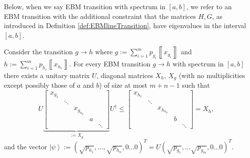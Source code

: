 \documentclass{article}
\begin{document}
Below, when we say EBM transition with spectrum in $[a,b]$, we refer
to an EBM transition with the additional constraint that the matrices
$H,G$,  as introduced in Definition \ref{def:EBMlineTransition}, have eigenvalues in the interval $[a,b]$. 
\begin{lemma}
 
Consider the transition $g\to h$ where $g:=\sum_{i=1}^{m}p_{g_{i}}\left\llbracket x_{g_{i}}\right\rrbracket $
and $h:=\sum_{i=1}^{m}p_{h_{i}}\left\llbracket x_{h_{i}}\right\rrbracket $.
For every EBM transition $g\to h$ with spectrum in $[a,b]$ there
exists a unitary matrix $U$, diagonal matrices $X_{h}$, $X_{g}$
(with no multiplicities except possibly those of $a$ and $b$) of
size at most $m+n-1$ such that 
\begin{equation}
U\underbrace{\left[\begin{array}{ccccc}
x_{g_{1}}\\
 & \ddots\\
 &  & x_{g_{n_{g}}}\\
 &  &  & a\\
 &  &  &  & \ddots
\end{array}\right]}_{:=X_{g}}U^{\dagger}\le\left[\begin{array}{ccccc}
x_{h_{1}}\\
 & \ddots\\
 &  & x_{h_{n_{h}}}\\
 &  &  & b\\
 &  &  &  & \ddots
\end{array}\right]=X_{h},\label{eq:conditionEBMcharacterised}
\end{equation}
and the vector $\left|\psi\right\rangle :=(\sqrt{p_{h_{1}}},\dots,\sqrt{p_{h_{n}}},0\dots0)^{T}=U(\sqrt{p_{g_{1}}},\dots\sqrt{p_{g_{m}}},0\dots0)^{T}$.
\label{lem:EBRMisCOF}
\end{lemma}
\end{document}
